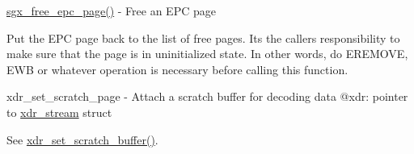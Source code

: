 \mbox{\hyperlink{arch_2x86_2kernel_2cpu_2sgx_2main_8c_aad7fdd4831fa0bf3d82eb2f54fe4a1d1}{sgx\+\_\+free\+\_\+epc\+\_\+page()}} -\/ Free an E\+PC page

Put the E\+PC page back to the list of free pages. It\textquotesingle{}s the caller\textquotesingle{}s responsibility to make sure that the page is in uninitialized state. In other words, do E\+R\+E\+M\+O\+VE, E\+WB or whatever operation is necessary before calling this function.

xdr\+\_\+set\+\_\+scratch\+\_\+page -\/ Attach a scratch buffer for decoding data @xdr\+: pointer to \mbox{\hyperlink{structxdr__stream}{xdr\+\_\+stream}} struct

See \mbox{\hyperlink{sunrpc_2xdr_8h_a1e6b687b64b8c78f4fc7e6e47d8833cf}{xdr\+\_\+set\+\_\+scratch\+\_\+buffer()}}. 